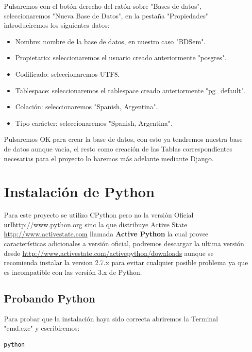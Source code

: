 Pulsaremos con el botón derecho del ratón sobre "Bases de datos", seleccionaremos "Nueva Base de Datos", en la pestaña "Propiedades" introduciremos los siguientes datos:

\begin{itemize}
    \item Nombre: nombre de la base de datos, en nuestro caso "BDSem".
    \item Propietario: seleccionaremos el usuario creado anteriormente "posgres".
    \item Codificado: seleccionaremos UTF8.
    \item Tablespace: seleccionaremos el tablespace creado anteriormente "pg\_default".
    \item Colación: seleccionaremos "Spanish, Argentina".
    \item Tipo carácter: seleccionaremos "Spanish, Argentina".
\end{itemize}

Pulsaremos OK para crear la base de datos, con esto ya tendremos nuestra base de datos aunque vacía, el resto como creación de las Tablas correspondientes necesarias para el proyecto lo haremos más adelante mediante Django.



\section{Instalación de Python}

Para este proyecto se utilizo CPython pero no la versión Oficial url{http://www.python.org} sino la que distribuye Active State \url{http://www.activestate.com} llamada {\bfseries Active Python} la cual provee características adicionales a versión oficial, podremos descargar la ultima versión desde  \url{http://www.activestate.com/activepython/downloads} aunque se recomienda instalar la version 2.7.x para evitar cualquier posible problema ya que es incompatible con las versión 3.x de Python.

\subsection{Probando Python}
Para probar que la instalación haya sido correcta abriremos la Terminal "cmd.exe" y escribiremos:

\begin{lstlisting}[style=consola, numbers=none]
    python
\end{lstlisting} 

